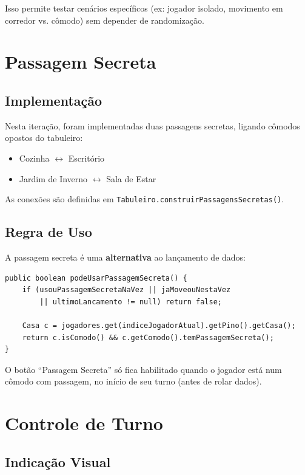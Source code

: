 \documentclass[12pt,a4paper]{report}
\begin{document}
Isso permite testar cenários específicos (ex: jogador isolado, movimento em corredor vs. cômodo) sem depender de randomização.

\section{Passagem Secreta}

\subsection{Implementação}

Nesta iteração, foram implementadas duas passagens secretas, ligando cômodos opostos do tabuleiro:
\begin{itemize}
    \item Cozinha $\leftrightarrow$ Escritório
    \item Jardim de Inverno $\leftrightarrow$ Sala de Estar
\end{itemize}

As conexões são definidas em \texttt{Tabuleiro.construirPassagensSecretas()}.

\subsection{Regra de Uso}

A passagem secreta é uma \textbf{alternativa} ao lançamento de dados:

\begin{lstlisting}
public boolean podeUsarPassagemSecreta() {
    if (usouPassagemSecretaNaVez || jaMoveouNestaVez
        || ultimoLancamento != null) return false;

    Casa c = jogadores.get(indiceJogadorAtual).getPino().getCasa();
    return c.isComodo() && c.getComodo().temPassagemSecreta();
}
\end{lstlisting}

O botão ``Passagem Secreta'' só fica habilitado quando o jogador está num cômodo com passagem, no início de seu turno (antes de rolar dados).

\section{Controle de Turno}

\subsection{Indicação Visual}
\end{document}
